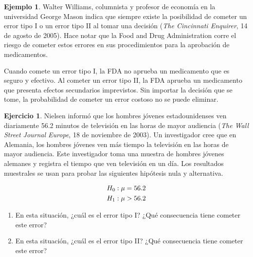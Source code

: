 \documentclass[
]{book}
\providecommand{\tightlist}{%
  \setlength{\itemsep}{0pt}\setlength{\parskip}{0pt}}
\theoremstyle{definition}
\theoremstyle{definition}
\newtheorem{example}{Ejemplo}[chapter]
\theoremstyle{definition}
\newtheorem{exercise}{Ejercicio}[chapter]
\theoremstyle{definition}
\theoremstyle{remark}
\begin{document}
\begin{example}
Walter Williams, columnista y profesor de economía en la universidad George Mason indica que siempre existe la posibilidad de cometer un error tipo I o un error tipo II al tomar una decisión (\emph{The Cincinnati Enquirer}, 14 de agosto de 2005). Hace notar que la Food and Drug Administration corre el riesgo de cometer estos errores en sus procedimientos para la aprobación de medicamentos.

Cuando comete un error tipo I, la FDA no aprueba un medicamento que es seguro y efectivo. Al cometer un error tipo II, la FDA aprueba un medicamento que presenta efectos secundarios imprevistos. Sin importar la decisión que se tome, la probabilidad de cometer un error costoso no se puede eliminar.
\end{example}

\begin{exercise}

Nielsen informó que los hombres jóvenes estadounidenses ven diariamente 56.2 minutos de televisión en las horas de mayor audiencia (\emph{The Wall Street Journal Europe}, 18 de noviembre de 2003). Un investigador cree que en Alemania, los hombres jóvenes ven más tiempo la televisión en las horas de mayor audiencia. Este investigador toma una muestra de hombres jóvenes alemanes y registra el tiempo que ven televisión en un día. Los resultados muestrales se usan para probar las siguientes hipótesis nula y alternativa.

\begin{equation}
\notag
\begin{split}
H_0&: \mu = 56.2\\
H_1&: \mu > 56.2\\
\end{split}
\end{equation}

\begin{enumerate}
\def\labelenumi{\alph{enumi}.}
\tightlist
\item
  En esta situación, ¿cuál es el error tipo I? ¿Qué consecuencia tiene cometer este error?
\item
  En esta situación, ¿cuál es el error tipo II? ¿Qué consecuencia tiene cometer este error?
\end{enumerate}

\end{exercise}
\end{document}
